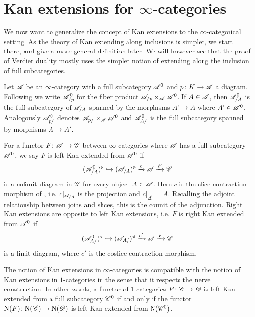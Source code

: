 \documentclass[../../thesis.tex]{subfiles}
\begin{document}
\section{Kan extensions for $\infty$-categories}
We now want to generalize the concept of Kan extensions to the $\infty$-categorical setting.
As the theory of Kan extending along inclusions is simpler, we start there, and give a more general definition later.
We will however see that the proof of Verdier duality mostly uses the simpler notion of extending along the inclusion of full subcategories.
\begin{definition}
    Let $\mathscr{A}$ be an $\infty$-category with a full subcategory $\mathscr{A}^0$ and $p\colon K\to \mathscr{A}$ a diagram.
    Following \cite[Notation 4.3.2.1]{HTT} we write $\mathscr{A}^0_{/p}$ for the fiber product $\mathscr{A}_{/p}\times_{\mathscr{A}}\mathscr{A}^0$.
    If $A\in \mathscr{A}$, then $\mathscr{A}^0_{/A}$ is the full subcategory of $\mathscr{A}_{/A}$ spanned by the morphisms $A'\to A$ where $A'\in \mathscr{A}^0$.
    \newline
    Analogously $\mathscr{A}^0_{p/}$ denotes $\mathscr{A}_{p/}\times_{\mathscr{A}}\mathscr{A}^0$ and $\mathscr{A}^0_{A/}$ is the full subcategory spanned by morphisms $A\to A'$.
\end{definition}
\begin{definition}\label{KanDef}
    For a functor $F\colon \mathscr{A} \to \mathscr{C}$ between $\infty$-categories where $\mathscr{A}$ has a full subcategory $\mathscr{A}^0$, we say $F$ is left Kan extended from $\mathscr{A}^{0}$ if
    \[
        (\mathscr{A}^{0}_{/A})^{\triangleright} \hookrightarrow (\mathscr{A}_{/A})^{\triangleright} \xrightarrow{c} \mathscr{A} \xrightarrow{F}\mathscr{C}
    \]
    is a colimit diagram in $\mathscr{C}$ for every object $A\in \mathscr{A}$.
    Here $c$ is the slice contraction morphism of \cite[\href{https://kerodon.net/tag/0188}{Tag 0188}]{kerodon}, i.e.
    $c|_{\mathscr{A}_{/A}}$ is the projection and $c|_{\Delta^0}=A$.
    Recalling the adjoint relationship between joins and slices, this is the counit of the adjunction.
    \newline
    Right Kan extensions are opposite to left Kan extensions, i.e. $F$ is right Kan extended from $\mathscr{A}^0$ if
    \[
        (\mathscr{A}^{0}_{A/})^{\triangleleft} \hookrightarrow (\mathscr{A}_{A/})^{\triangleleft} \xrightarrow{c'} \mathscr{A} \xrightarrow{F}\mathscr{C}
    \]
    is a limit diagram, where $c'$ is the coslice contraction morphism.
\end{definition}
\begin{example}
    The notion of Kan extensions in $\infty$-categories is compatible with the notion of Kan extensions in $1$-categories in the sense that it respects the nerve construction.
    In other words, a functor of $1$-categories $F \colon \mathscr{C} \to \mathscr{D}$ is left Kan extended from a full subcategory $\mathscr{C}^{0}$ if and only if the functor $\mathrm{N}(F) \colon \mathrm{N}(\mathscr{C}) \to \mathrm{N}(\mathscr{D})$ is left Kan extended from $\mathrm{N}(\mathscr{C}^{0})$.
\end{example}
\end{document}
